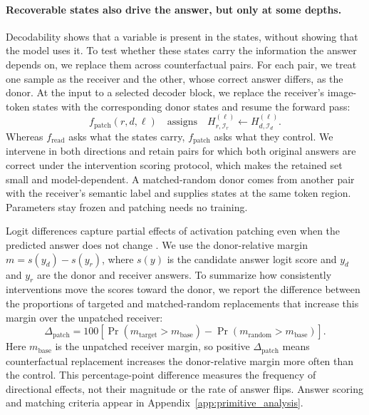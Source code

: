 \documentclass{article} %
\begin{document}
\paragraph{Recoverable states also drive the answer, but only at some depths.}
Decodability shows that a variable is present in the states, without showing that the model uses it. To test whether these states carry the information the answer depends on, we replace them across counterfactual pairs. For each pair, we treat one sample as the receiver and the other, whose correct answer differs, as the donor. At the input to a selected decoder block, we replace the receiver's image-token states with the corresponding donor states and resume the forward pass:
\begin{equation}
    f_{\mathrm{patch}}(r,d,\ell)\quad\text{assigns}\quad
    H_{r,\mathcal I_r}^{(\ell)}\leftarrow H_{d,\mathcal I_d}^{(\ell)}.
\end{equation}
Whereas $f_{\mathrm{read}}$ asks what the states carry, $f_{\mathrm{patch}}$ asks what they control. We intervene in both directions and retain pairs for which both original answers are correct under the intervention scoring protocol, which makes the retained set small and model-dependent. A matched-random donor comes from another pair with the receiver's semantic label and supplies states at the same token region. Parameters stay frozen and patching needs no training.

Logit differences capture partial effects of activation patching even when the predicted answer does not change \citep{heimersheim2024activation}. We use the donor-relative margin $m=s(y_d)-s(y_r)$, where $s(y)$ is the candidate answer logit score and $y_d$ and $y_r$ are the donor and receiver answers. To summarize how consistently interventions move the scores toward the donor, we report the difference between the proportions of targeted and matched-random replacements that increase this margin over the unpatched receiver:
\begin{equation}
    \Delta_{\mathrm{patch}}=100\left[
    \Pr(m_{\mathrm{target}}>m_{\mathrm{base}})
    -\Pr(m_{\mathrm{random}}>m_{\mathrm{base}})
    \right].
\end{equation}
Here $m_{\mathrm{base}}$ is the unpatched receiver margin, so positive $\Delta_{\mathrm{patch}}$ means counterfactual replacement increases the donor-relative margin more often than the control. This percentage-point difference measures the frequency of directional effects, not their magnitude or the rate of answer flips. Answer scoring and matching criteria appear in Appendix~\ref{app:primitive_analysis}.
\end{document}
